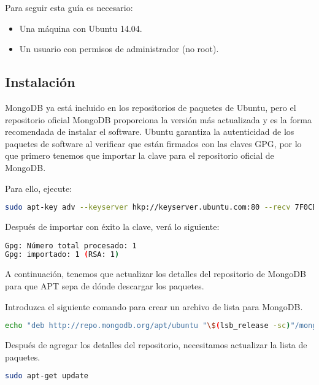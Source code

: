 Para seguir esta guía es necesario:
\begin{itemize}

\item{Una máquina con Ubuntu 14.04.}
\item{Un usuario con permisos de administrador (no root).}
\end{itemize}

\subsection{Instalación}


MongoDB ya está incluido en los repositorios de paquetes de Ubuntu, pero el repositorio oficial MongoDB proporciona la versión más actualizada y es la forma recomendada de instalar el software. Ubuntu garantiza la autenticidad de los paquetes de software al verificar que están firmados con las claves GPG, por lo que primero tenemos que importar la clave para el repositorio oficial de MongoDB.

Para ello, ejecute:

\begin{lstlisting}[language=bash]
sudo apt-key adv --keyserver hkp://keyserver.ubuntu.com:80 --recv 7F0CEB10
\end{lstlisting}


Después de importar con éxito la clave, verá lo siguiente:

\begin{lstlisting}[language=bash]
Gpg: Número total procesado: 1
Gpg: importado: 1 (RSA: 1)
\end{lstlisting}

A continuación, tenemos que actualizar los detalles del repositorio de MongoDB para que APT sepa de dónde descargar los paquetes.

Introduzca el siguiente comando para crear un archivo de lista para MongoDB.

\begin{lstlisting}[language=bash]
echo "deb http://repo.mongodb.org/apt/ubuntu "\$(lsb_release -sc)"/mongodb-org/3.0 multiverse" | sudo tee /etc/apt/sources.list.d/mongodb-org-3.0.list
\end{lstlisting}

Después de agregar los detalles del repositorio, necesitamos actualizar la lista de paquetes.

\begin{lstlisting}[language=bash]
sudo apt-get update
\end{lstlisting}


